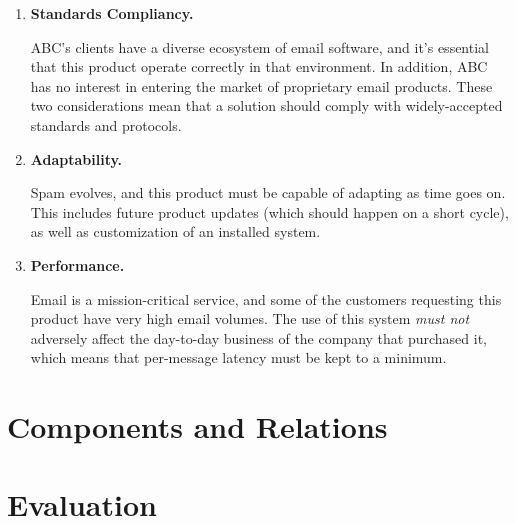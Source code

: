\documentclass[11pt,letterpaper]{article}
\begin{document}
\begin{enumerate}
\item \textbf{Standards Compliancy.}

  ABC's clients have a diverse ecosystem of email software, and it's essential
  that this product operate correctly in that environment.  In addition, ABC
  has no interest in entering the market of proprietary email products.  These
  two considerations mean that a solution should comply with widely-accepted
  standards and protocols.

\item \textbf{Adaptability.}

  Spam evolves, and this product must be capable of adapting as time goes on.
  This includes future product updates (which should happen on a short cycle),
  as well as customization of an installed system.

\item \textbf{Performance.}

  Email is a mission-critical service, and some of the customers requesting
  this product have very high email volumes.  The use of this system
  \textit{must not} adversely affect the day-to-day business of the company
  that purchased it, which means that per-message latency must be kept to a
  minimum.  

\end{enumerate}

\section{Components and Relations}

\section{Evaluation}
\end{document}
